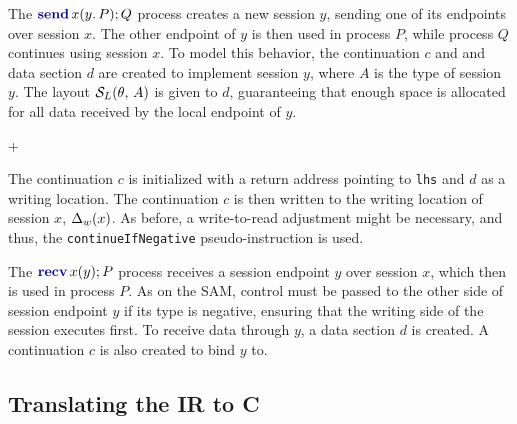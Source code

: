 \documentclass[sigconf,nonacm,natbib=true]{acmart}
\begin{document}
The $\sendc{x}{y}{P}Q$ process creates a new session $y$, sending one of its endpoints over session $x$. The other endpoint of $y$ is then used in process $P$, while process $Q$ continues using session $x$. To model this behavior, the continuation $c$ and and data section $d$ are created to implement session $y$, where $A$ is the type of session $y$. The layout $\mathcal{S}_L(\theta,\,A)$ is given to $d$, guaranteeing that enough space is allocated for all data received by the local endpoint of $y$.

\begin{compilation}{\theta}{\Delta}{}
{ + }
     
\end{compilation}

The continuation $c$ is initialized with a return address pointing to \texttt{lhs} and $d$ as a writing location. The continuation $c$ is then written to the writing location of session $x$, $\Delta_w(x)$. As before, a write-to-read adjustment might be necessary, and thus, the \texttt{continueIfNegative} pseudo-instruction is used.

The $\recvc{x}{y}P$ process receives a session endpoint $y$ over session $x$, which then is used in process $P$. As on the \ac{SAM}, control must be passed to the other side of session endpoint $y$ if its type is negative, ensuring that the writing side of the session executes first. To receive data through $y$, a data section $d$ is created. A continuation $c$ is also created to bind $y$ to.
\begin{compilation}{\theta}{\Delta}{}
{}
     
\end{compilation}

\subsection{Translating the IR to C}
\end{document}
